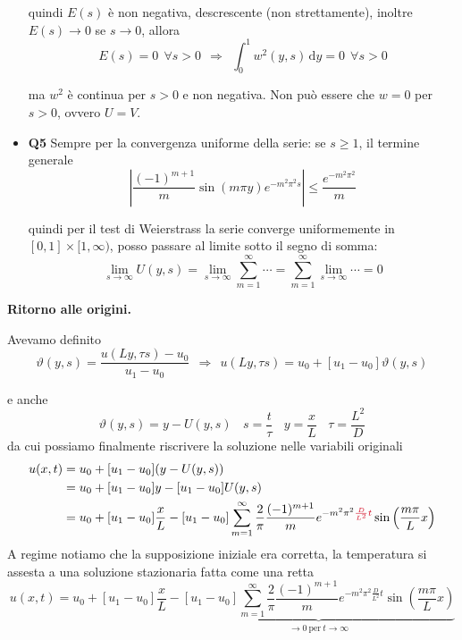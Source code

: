 \documentclass[10pt,a4paper,twoside,openright]{book}
\newcommand{\de}{\,\mathrm d}
\newcommand{\dy}{\de y}
\begin{document}
\begin{itemize}
quindi $E(s)$ è non negativa, descrescente (non strettamente), inoltre $E(s)\rightarrow 0$ se $s\rightarrow 0$, allora
\begin{equation*}
E(s) =0\ \ \forall s >0\ \ \Rightarrow \ \ \int ^{1}_{0} w^{2}(y,s) \dy=0\ \ \forall s >0
\end{equation*}

ma $w^{2}$ è continua per $s >0$ e non negativa. Non può essere che $w=0$ per $s >0$, ovvero $U=V$.
\item \textbf{Q5} Sempre per la convergenza uniforme della serie: se $\displaystyle s\geqslant 1$, il termine generale \begin{equation*}
\left| \frac{(-1)^{m+1}}{m}\sin(m\pi y) e^{-m^{2} \pi ^{2} s}\right| \leqslant \frac{e^{-m^{2} \pi ^{2}}}{m}
\end{equation*}

quindi per il test di Weierstrass la serie converge uniformemente in $\displaystyle [ 0,1] \times [ 1,\infty)$, posso passare al limite sotto il segno di somma:
\begin{equation*}
	\lim_{s \to \infty} U(y,s) = \lim_{s \to \infty} \sum\limits ^{\infty }_{m=1}\cdots = \sum\limits ^{\infty }_{m=1} \lim_{s \to \infty} \cdots = 0
\end{equation*}
\end{itemize}



\textbf{Ritorno alle origini.}

Avevamo definito
\begin{equation*}
\vartheta(y,s) =\frac{u(Ly,\tau s) -u_{0}}{u_{1} -u_{0}} \ \ \Rightarrow \ \ u(Ly,\tau s) =u_{0} +[ u_{1} -u_{0}] \vartheta(y,s)
\end{equation*}

e anche
\begin{equation*}
\vartheta(y,s) =y-U(y,s) \ \ \ \ s=\frac{t}{\tau } \ \ \ \ y=\frac{x}{L} \ \ \ \ \tau =\frac{L^{2}}{D}
\end{equation*}
da cui possiamo finalmente riscrivere la soluzione nelle variabili originali
\begin{align*}
u(x,t) & =u_{0} +[ u_{1} -u_{0}](y-U(y,s))\\
 & =u_{0} +[ u_{1} -u_{0}] y-[ u_{1} -u_{0}] U(y,s)\\
 & =u_{0} +[ u_{1} -u_{0}]\frac{x}{L} -[ u_{1} -u_{0}]\sum\limits ^{\infty }_{m=1}\frac{2}{\pi }\frac{(-1)^{m+1}}{m} e^{-m^{2} \pi ^{2}\textcolor[rgb]{0.82,0.01,0.11}{\frac{D}{L^{2}}}\textcolor[rgb]{0.82,0.01,0.11}{t}}\sin\left(\frac{m\pi }{L} x\right)
\end{align*}
A regime notiamo che la supposizione iniziale era corretta, la temperatura si assesta a una soluzione stazionaria fatta come una retta
\begin{equation*}
u(x,t) =u_{0} +[ u_{1} -u_{0}]\frac{x}{L} -\underbrace{[ u_{1} -u_{0}]\sum\limits ^{\infty }_{m=1}\frac{2}{\pi }\frac{(-1)^{m+1}}{m} e^{-m^{2} \pi ^{2}\frac{D}{L^{2}} t}\sin\left(\frac{m\pi }{L} x\right)}_{\rightarrow 0\ \text{per} \ t\rightarrow \infty }
\end{equation*}
\end{document}

